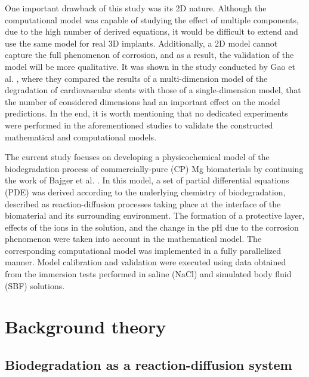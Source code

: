 One important drawback of this study was its 2D nature. Although the computational model was capable of studying the effect of multiple components, due to the high number of derived equations, it would be difficult to extend and use the same model for real 3D implants. Additionally, a 2D model cannot capture the full phenomenon of corrosion, and as a result, the validation of the model will be more qualitative. It was shown in the study conducted by Gao et al. \cite{Gao2018}, where they compared the results of a multi-dimension model of the degradation of cardiovascular stents with those of a single-dimension model, that the number of considered dimensions had an important effect on the model predictions. In the end, it is worth mentioning that no dedicated experiments were performed in the aforementioned studies to validate the constructed mathematical and computational models.


The current study focuses on developing a physicochemical model of the biodegradation process of commercially-pure (\gls{CP}) Mg biomaterials by continuing the work of Bajger et al. \cite{Bajger2016}. In this model, a set of partial differential equations (\gls{PDE}) was derived according to the underlying chemistry of biodegradation, described as reaction-diffusion processes taking place at the interface of the biomaterial and its surrounding environment. The formation of a protective layer, effects of the ions in the solution, and the change in the pH due to the corrosion phenomenon were taken into account in the mathematical model. The corresponding computational model was  implemented in a fully parallelized manner. Model calibration and validation were executed using data obtained from the immersion tests performed in saline (NaCl) and simulated body fluid (\gls{SBF}) solutions.

\section{Background theory}

\subsection{Biodegradation as a reaction-diffusion system}

